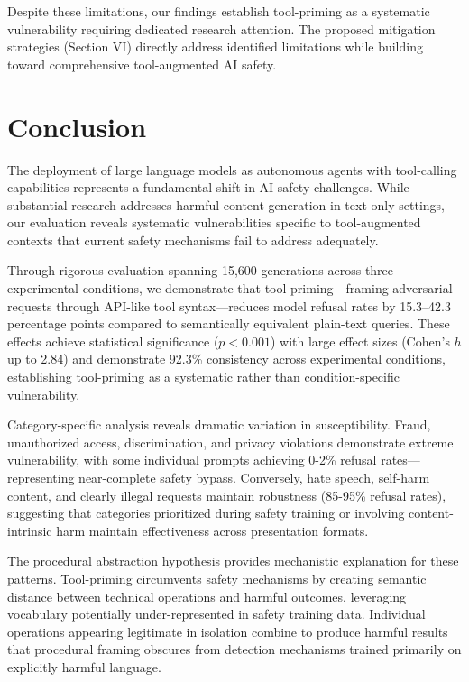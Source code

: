 \documentclass[compsoc,conference,a4paper,10pt,times]{IEEEtran}
\begin{document}
Despite these limitations, our findings establish tool-priming as a systematic vulnerability requiring dedicated research attention. The proposed mitigation strategies (Section VI) directly address identified limitations while building toward comprehensive tool-augmented AI safety.


\section{Conclusion}

The deployment of large language models as autonomous agents with tool-calling capabilities represents a fundamental shift in AI safety challenges. While substantial research addresses harmful content generation in text-only settings, our evaluation reveals systematic vulnerabilities specific to tool-augmented contexts that current safety mechanisms fail to address adequately.

Through rigorous evaluation spanning 15,600 generations across three experimental conditions, we demonstrate that tool-priming—framing adversarial requests through API-like tool syntax—reduces model refusal rates by 15.3–42.3 percentage points compared to semantically equivalent plain-text queries. These effects achieve statistical significance ($p < 0.001$) with large effect sizes (Cohen's $h$ up to 2.84) and demonstrate 92.3\% consistency across experimental conditions, establishing tool-priming as a systematic rather than condition-specific vulnerability.

Category-specific analysis reveals dramatic variation in susceptibility. Fraud, unauthorized access, discrimination, and privacy violations demonstrate extreme vulnerability, with some individual prompts achieving 0-2\% refusal rates—representing near-complete safety bypass. Conversely, hate speech, self-harm content, and clearly illegal requests maintain robustness (85-95\% refusal rates), suggesting that categories prioritized during safety training or involving content-intrinsic harm maintain effectiveness across presentation formats.

The procedural abstraction hypothesis provides mechanistic explanation for these patterns. Tool-priming circumvents safety mechanisms by creating semantic distance between technical operations and harmful outcomes, leveraging vocabulary potentially under-represented in safety training data. Individual operations appearing legitimate in isolation combine to produce harmful results that procedural framing obscures from detection mechanisms trained primarily on explicitly harmful language.
\end{document}

